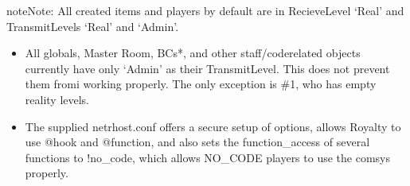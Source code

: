 \documentclass[letterpaper,10pt,english]{sphinxmanual}
\begin{document}
\begin{sphinxadmonition}{note}{Note:}
\sphinxAtStartPar
All created items and players by default are in Recieve\sphinxhyphen{}Level ‘Real’ and
Transmit\sphinxhyphen{}Levels ‘Real’ and ‘Admin’.
\end{sphinxadmonition}
\begin{itemize}
\item {} 
\sphinxAtStartPar
All globals, Master Room, BCs\sphinxhyphen{}*, and other staff/code\sphinxhyphen{}related objects
currently have only ‘Admin’ as their Transmit\sphinxhyphen{}Level. This does not prevent
them fromi working properly. The only exception is \#1, who has empty reality
levels.

\item {} 
\sphinxAtStartPar
The supplied netrhost.conf offers a secure setup of options, allows Royalty
to use @hook and @function, and also sets the function\_access of several
functions to !no\_code, which allows NO\_CODE players to use the comsys
properly.

\end{itemize}
\end{document}
